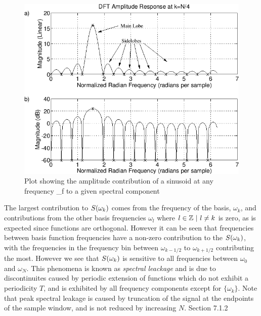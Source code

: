 \begin{figure}[h] \centering
  \includegraphics[width=\textwidth]{Figures/Chapters/SignalAnalysis/img1065}
  \caption{Plot showing the amplitude contribution of a sinusoid at any
frequency \omega_f to a given spectral component}
  \label{fig:amplitude-contribution-to-component-by-freq}
\end{figure} The largest contribution to $S(\omega_k)$ comes from the
frequency of the basis, $\omega_k$, and contributions from the other basis
frequencies $\omega_l$ where $l \in { \mathbb{Z}\ |\ l \ne k}$ is zero, as is
expected since functions are orthogonal. However it can be seen that frequencies
between basis function frequencies have a non-zero contribution to the
$S(\omega_k)$, with the frequencies in the frequency bin between
$\omega_{k-1/2}$ to $\omega_{k+1/2}$ contributing the most. However we see that
$S(\omega_k)$ is sensitive to all frequencies between $\omega_0$ and
$\omega_N$. This phenomena is known as \textit{spectral leackage} and is due to
discontinuites caused by periodic extension of functions which do not exhibit a
periodicity $T$, and is exhibited by all frequency components except for $\{
\omega_k \}$. Note that peak spectral leakage is caused by truncation of the
signal at the endpoints of the sample window, and is not reduced by increasing
$N$\cite{}. %
Section 7.1.2

